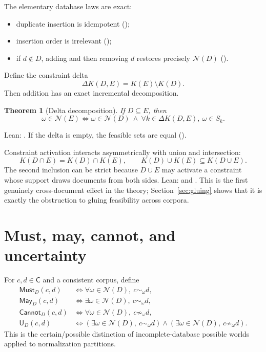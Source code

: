 \documentclass[11pt]{article}
\newtheorem{theorem}{Theorem}[section]
\theoremstyle{definition}
\theoremstyle{remark}
\newcommand{\Feas}{\mathcal N}
\newcommand{\Claims}{\mathsf C}
\newcommand{\Must}{\mathsf{Must}}
\newcommand{\May}{\mathsf{May}}
\newcommand{\Cannot}{\mathsf{Cannot}}
\newcommand{\Uncertain}{\mathsf U}
\begin{document}
The elementary database laws are exact:
\begin{itemize}
  \item duplicate insertion is idempotent
        ();
  \item insertion order is irrelevant
        ();
  \item if $d\notin D$, adding and then removing $d$ restores precisely
        $\Feas(D)$ ().
\end{itemize}

Define the constraint delta
\[
  \Delta K(D,E)=K(E)\setminus K(D).
\]
Then addition has an exact incremental decomposition.

\begin{theorem}[Delta decomposition]
If $D\subseteq E$, then
\[
  \omega\in\Feas(E)
  \Longleftrightarrow
  \omega\in\Feas(D)\ \land\
  \forall k\in\Delta K(D,E),\ \omega\in S_k.
\]
\end{theorem}
\noindent Lean: .  If the delta is empty,
the feasible sets are equal
().

Constraint activation interacts asymmetrically with union and intersection:
\[
 K(D\cap E)=K(D)\cap K(E),
 \qquad K(D)\cup K(E)\subseteq K(D\cup E).
\]
The second inclusion can be strict because $D\cup E$ may activate a constraint
whose support draws documents from both sides.  Lean:
 and
.  This is the first genuinely
cross-document effect in the theory; Section~\ref{sec:gluing} shows that it is
exactly the obstruction to gluing feasibility across corpora.

\section{Must, may, cannot, and uncertainty}\label{sec:modal}

For $c,d\in\Claims$ and a consistent corpus, define
\begin{align}
 \Must_D(c,d)
   &\Longleftrightarrow \forall\omega\in\Feas(D),\ c\sim_\omega d,\\
 \May_D(c,d)
   &\Longleftrightarrow \exists\omega\in\Feas(D),\ c\sim_\omega d,\\
 \Cannot_D(c,d)
   &\Longleftrightarrow \forall\omega\in\Feas(D),\ c\not\sim_\omega d,\\
 \Uncertain_D(c,d)
   &\Longleftrightarrow
     (\exists\omega\in\Feas(D),\ c\sim_\omega d)\land
     (\exists\omega\in\Feas(D),\ c\not\sim_\omega d).
\end{align}
This is the certain/possible distinction of incomplete-database possible
worlds \citep{imielinski1984incomplete} applied to normalization partitions.
\end{document}
